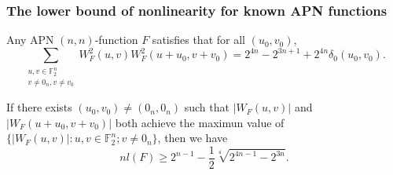 \documentclass[
    aspectratio=169,                   %
]{beamer}
\newcommand{\F}{\mathbb{F}}
\begin{document}
    \begin{frame}
        \frametitle{The lower bound of nonlinearity for known APN functions}
        \begin{theorem}
            Any APN $ (n,n) $-function $ F $ satisfies that  for all $ (u_0,v_0) $,
            \[\sum_{\substack{u,v\in\F_2^n\\v\neq 0_n,v\neq v_0}}W_F^2(u,v)W_F^2(u+u_0,v+v_0)=2^{4n}-2^{3n+1}+2^{4n}\delta_0(u_0,v_0).\] 
        \end{theorem}
        \begin{corollary}
            If there exists $ (u_0,v_0)\neq(0_n,0_n) $ such that $ |W_F(u,v)| $ and $ |W_F(u+u_0,v+v_0)| $ 
            both achieve the maximun value of $ \{|W_F(u,v)|:u,v\in\F_2^n;v\neq 0_n\} $, 
            then we have 
            \[nl(F)\geq 2^{n-1}-\frac{1}{2}\sqrt[4]{2^{4n-1}-2^{3n}}.\]
        \end{corollary}
    
    \end{frame}
    \makebottom     %
\end{document}
